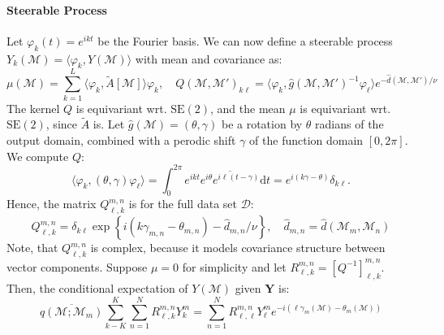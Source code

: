 \documentclass{article}
\newcommand{\manifold}{\mathcal{M}}
\newcommand{\euclid}[1]{\mathrm{SE}(#1)}
\newcommand{\data}{\mathcal{D}}
\begin{document}
    \paragraph{Steerable Process}
    Let $\varphi_k(t) = e^{ikt}$ be the Fourier basis. We can now define a steerable process $Y_k(\manifold) = \langle \varphi_k, Y(\manifold)\rangle$ with mean and covariance as:
    \[
    \mu(\manifold) = \sum_{k=1}^L\langle \varphi_k, \tilde{A}[\manifold]\rangle\varphi_k,\quad Q(\manifold, \manifold')_{k\ell} = \langle \varphi_k, \widehat{g}(\manifold,\manifold')^{-1}\varphi_\ell\rangle e^{-\widehat{d}(\manifold,\manifold')/\nu}
    \]
    The kernel $Q$ is equivariant wrt. $\euclid{2}$, and the mean $\mu$ is equivariant wrt. $\euclid{2}$, since $\tilde{A}$ is. Let $\widehat{g}(\manifold) = (\theta,\gamma)$ be a rotation by $\theta$ radians of the output domain, combined with a perodic shift $\gamma$ of the function domain $[0,2\pi]$. We compute $Q$:
    \[
        \langle \varphi_k, (\theta, \gamma)\varphi_\ell\rangle = \int_0^{2\pi}e^{ikt}\overline{e^{i\theta}e^{i\ell(t-\gamma)}}\mathrm{d}t = e^{i(k\gamma-\theta)}\delta_{k\ell}.
    \]
    Hence, the matrix $Q_{\ell,k}^{m,n}$ is for the full data set $\data$:
    \[
        Q_{\ell,k}^{m,n} = \delta_{k\ell}\exp\left\{i(k\gamma_{m,n}-\theta_{m,n})-\widehat{d}_{m,n}/\nu\right\}, \quad \widehat{d}_{m,n} = \widehat{d}(\manifold_m,\manifold_n)
    \]
    Note, that $Q_{\ell,k}^{m,n}$ is complex, because it models covariance structure between vector components. Suppose $\mu=0$ for simplicity and let $R_{\ell,k}^{m,n} = [Q^{-1}]_{\ell,k}^{m,n}$. Then, the conditional expectation of $Y(\manifold)$ given $\pmb Y$ is:
    \[
    \overline{q(\manifold; \manifold_m)}\sum_{k-K}^K \sum_{n=1}^N R_{\ell,k}^{m,n}Y_{k}^m = \sum_{n=1}^N R_{\ell,\ell}^{m,n}Y_{\ell}^m e^{-i(\ell\gamma_m(\manifold)-\theta_m(\manifold))}
    \]
    


    
\end{document}
